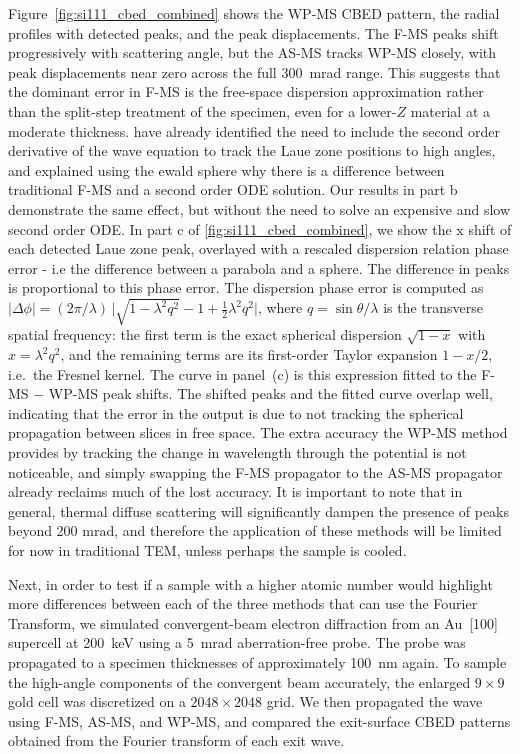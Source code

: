 \documentclass[preprint,12pt,number]{elsarticle}
\begin{document}
Figure~\ref{fig:si111_cbed_combined} shows the WP-MS CBED pattern, the radial
profiles with detected peaks, and the peak displacements. The F-MS peaks shift progressively with
scattering angle, but the AS-MS tracks WP-MS closely, with peak displacements near zero across the
full 300~mrad range. This suggests that
the dominant error in F-MS is the free-space dispersion approximation rather
than the split-step treatment of the specimen, even for a lower-$Z$ material at
a moderate thickness. \cite{hillier_role_2017} have already identified the need to include
the second order derivative of the wave equation to track the Laue zone positions to high angles,
and explained using the ewald sphere why there is a difference between traditional F-MS and a second order ODE solution. 
Our results in part b demonstrate the same effect, but without the need to solve an expensive and slow second order ODE. In part c of 
\ref{fig:si111_cbed_combined}, 
we show the x shift of each detected Laue zone peak, overlayed with a rescaled dispersion relation phase error -
i.e the difference between a parabola and a sphere. The difference in peaks is proportional to this phase error.
The dispersion phase error is computed as
$|\Delta\phi| = (2\pi / \lambda)\,
\bigl|\sqrt{1-\lambda^2 q^2} - 1 + \tfrac{1}{2}\lambda^2 q^2\bigr|$,
where $q=\sin\theta/\lambda$ is the transverse spatial frequency:
the first term is the exact spherical dispersion $\sqrt{1-x}$ with $x=\lambda^2 q^2$,
and the remaining terms are its first-order Taylor expansion $1-x/2$, i.e.\ the
Fresnel kernel. The curve in panel~(c) is this expression fitted to the
F-MS $-$ WP-MS peak shifts. The shifted peaks and the fitted curve overlap well, indicating 
that the error in the output is due to not tracking the spherical propagation between slices in free space. 
The extra accuracy the WP-MS method provides by tracking the change in wavelength through the potential is not 
noticeable, and simply swapping the F-MS propagator to the AS-MS propagator already reclaims much of the lost accuracy.
It is important to note that in general, thermal diffuse scattering will significantly dampen the presence of peaks 
beyond 200 mrad, and therefore the application of these methods will be limited for now in traditional TEM, unless perhaps the sample 
is cooled. 

Next, in order to test if a sample with a higher atomic number would highlight more differences 
between each of the three methods that can use the Fourier Transform, we simulated
convergent-beam electron diffraction from an Au~[100] supercell at 200~keV using
a 5~mrad aberration-free probe. The probe was
propagated to a specimen thicknesses of approximately 100~nm again. To
sample the high-angle components of the convergent beam accurately, the enlarged $9 \times 9$ gold 
cell was discretized on a $2048 \times 2048$ grid. We then propagated the wave using F-MS, AS-MS, and WP-MS, and
compared the exit-surface CBED patterns obtained from the Fourier transform of
each exit wave.
\end{document}
